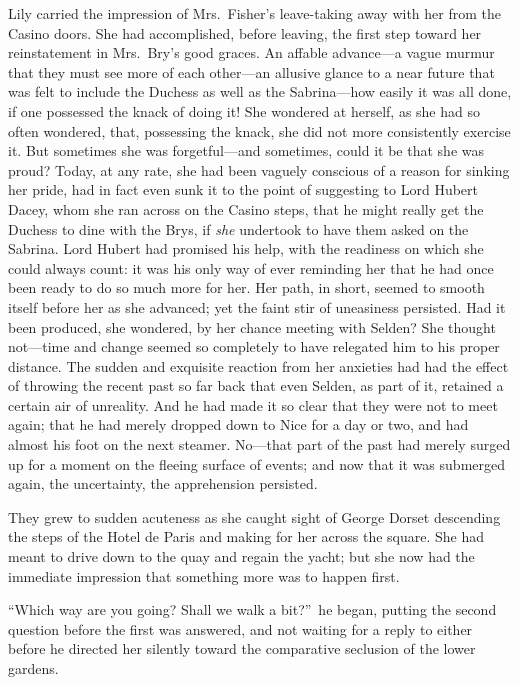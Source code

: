 \documentclass[12pt,a4paper]{book}
\begin{document}
Lily carried the impression of Mrs.\ Fisher's leave-taking away
with her from the Casino doors. She had accomplished, before
leaving, the first step toward her reinstatement in Mrs.\ Bry's
good graces. An affable advance---a vague murmur that they must
see more of each other---an allusive glance to a near future that
was felt to include the Duchess as well as the Sabrina---how
easily it was all done, if one possessed the knack of doing it! 
She wondered at herself, as she had so often wondered, that,
possessing the knack, she did not more consistently exercise it. 
But sometimes she was forgetful---and sometimes, could it be that
she was proud? Today, at any rate, she had been vaguely conscious
of a reason for sinking her pride, had in fact even sunk it to
the point of suggesting to Lord Hubert Dacey, whom she ran across
on the Casino steps, that he might really get the Duchess to dine
with the Brys, if \textit{she} undertook to have them asked on the
Sabrina. Lord Hubert had promised his help, with the readiness on
which she could always count: it was his only way of ever
reminding her that he had once been ready to do so much more for
her. Her path, in short, seemed to smooth itself before her as
she advanced; yet the faint stir of uneasiness persisted. Had it
been produced, she wondered, by her chance meeting with Selden? 
She thought not---time and change seemed so completely to have
relegated him to his proper distance. The sudden and exquisite
reaction from her anxieties had had the effect of throwing the
recent past so far back that even Selden, as part of it, retained
a certain air of unreality. And he had made it so clear
that they were not to meet again; that he had merely dropped down
to Nice for a day or two, and had almost his foot on the next
steamer. No---that part of the past had merely surged up for a
moment on the fleeing surface of events; and now that it was
submerged again, the uncertainty, the apprehension persisted.





They grew to sudden acuteness as she caught sight of George
Dorset descending the steps of the Hotel de Paris and making for
her across the square. She had meant to drive down to the quay
and regain the yacht; but she now had the immediate impression
that something more was to happen first.





``Which way are you going? Shall we walk a bit?''\ he began, putting
the second question before the first was answered, and not
waiting for a reply to either before he directed her silently
toward the comparative seclusion of the lower gardens.
\end{document}
